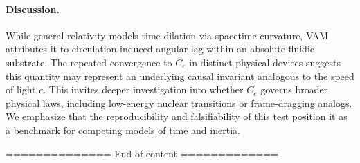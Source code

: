     \paragraph{Discussion.} While general relativity models time dilation via spacetime curvature, VAM attributes it to circulation-induced angular lag within an absolute fluidic substrate. The repeated convergence to $C_e$ in distinct physical devices suggests this quantity may represent an underlying causal invariant analogous to the speed of light $c$. This invites deeper investigation into whether $C_e$ governs broader physical laws, including low-energy nuclear transitions or frame-dragging analogs. We emphasize that the reproducibility and falsifiability of this test position it as a benchmark for competing models of time and inertia.


 ============== End of content =============

\ifdefined\standalonechapter\else



\fi